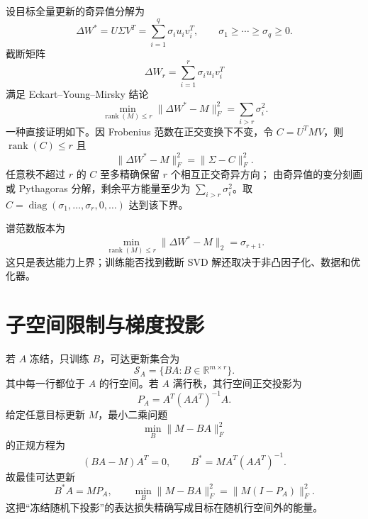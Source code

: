 \documentclass[11pt]{article}
\numberwithin{equation}{section}
\newcommand{\R}{\mathbb{R}}
\newcommand{\1}{\mathbf{1}}
\newcommand{\cS}{\mathcal{S}}
\newcommand{\diag}{\operatorname{diag}}
\begin{document}
设目标全量更新的奇异值分解为
\begin{equation}
 \Delta W^*=U\Sigma V^T
 =\sum_{i=1}^{q}\sigma_i u_iv_i^T,
 \qquad\sigma_1\ge\cdots\ge\sigma_q\ge0.
\end{equation}
截断矩阵
\begin{equation}
 \Delta W_r=\sum_{i=1}^{r}\sigma_i u_iv_i^T
\end{equation}
满足 Eckart--Young--Mirsky 结论
\begin{equation}
 \min_{\operatorname{rank}(M)\le r}
 \|\Delta W^*-M\|_F^2
 =\sum_{i>r}\sigma_i^2.
\end{equation}
一种直接证明如下。因 Frobenius 范数在正交变换下不变，令
$C=U^TMV$，则 $\operatorname{rank}(C)\le r$ 且
\begin{equation}
 \|\Delta W^*-M\|_F^2=\|\Sigma-C\|_F^2.
\end{equation}
任意秩不超过 $r$ 的 $C$ 至多精确保留 $r$ 个相互正交奇异方向；
由奇异值的变分刻画或 Pythagoras 分解，剩余平方能量至少为
$\sum_{i>r}\sigma_i^2$。取
$C=\diag(\sigma_1,\ldots,\sigma_r,0,\ldots)$ 达到该下界。

谱范数版本为
\begin{equation}
 \min_{\operatorname{rank}(M)\le r}\|\Delta W^*-M\|_2=\sigma_{r+1}.
\end{equation}
这只是表达能力上界；训练能否找到截断 SVD 解还取决于非凸因子化、数据和优化器。

\section{子空间限制与梯度投影}

若 $A$ 冻结，只训练 $B$，可达更新集合为
\begin{equation}
 \cS_A=\{BA:B\in\R^{m\times r}\}.
\end{equation}
其中每一行都位于 $A$ 的行空间。若 $A$ 满行秩，其行空间正交投影为
\begin{equation}
 P_A=A^T(AA^T)^{-1}A.
\end{equation}
给定任意目标更新 $M$，最小二乘问题
\begin{equation}
 \min_B\|M-BA\|_F^2
\end{equation}
的正规方程为
\begin{equation}
 (BA-M)A^T=0,\qquad
 B^*=MA^T(AA^T)^{-1}.
\end{equation}
故最佳可达更新
\begin{equation}
 B^*A=MP_A,\qquad
 \min_B\|M-BA\|_F^2=\|M(I-P_A)\|_F^2.
\end{equation}
这把“冻结随机下投影”的表达损失精确写成目标在随机行空间外的能量。
\end{document}

